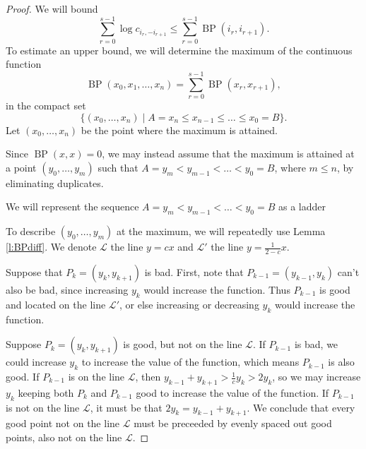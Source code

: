\documentclass[10pt,a4paper]{amsart}
\newcommand{\BP}{\operatorname{BP}}
\begin{document}
\begin{proof}
We will bound
\[\sum_{r=0}^{s-1} \log c_{i_r,-i_{r+1}}\leq
\sum_{r=0}^{s-1}\BP(i_r,i_{r+1}).\]
To estimate an upper bound, we will determine the maximum of the continuous function
\[\BP(x_0,x_1,\ldots,x_n)=\sum_{r=0}^{s-1}\BP(x_r,x_{r+1}),\]
in the compact set
\[\{(x_0,\ldots, x_n)\mid A=x_n\leq x_{n-1}\leq\ldots \leq x_0=B\}.\]
Let $(x_0,\ldots, x_n)$ be the point
where the maximum is attained.

Since $\BP(x,x)=0$, we may instead assume that the maximum is
attained at a point $(y_0,\ldots, y_m)$ such that
$A=y_m<y_{m-1}<\ldots<y_0=B$, where $m\leq n$, by eliminating
duplicates.

We will represent the sequence $A=y_m<y_{m-1}<\ldots <y_0=B$ as
a ladder



\begin{center}

\end{center}

To describe $(y_0,\ldots, y_m)$ at the maximum, we will
repeatedly use Lemma \ref{l:BPdiff}. We denote $\mathcal{L}$ the line $y=cx$ and $\mathcal{L}'$ the line $y=\frac{1}{2-c}x$.

Suppose that $P_k=(y_k,y_{k+1})$ is bad. First, note that $P_{k-1}=(y_{k-1},y_k)$
can't also be bad, since increasing
$y_k$ would increase the function. Thus 
$P_{k-1}$ is good and located on the line $\mathcal{L}'$, or else increasing or decreasing
$y_k$ would increase the function.

Suppose $P_k=(y_k,y_{k+1})$ is good, but not on the line
$\mathcal{L}$. If $P_{k-1}$ is bad, we could increase $y_k$ to increase
the value of the function, which means $P_{k-1}$ is also
good. If $P_{k-1}$ is on the line $\mathcal{L}$, then
$y_{k-1}+y_{k+1}>\frac{1}{c}y_k>2y_k$, so we may increase $y_k$
keeping both $P_k$ and $P_{k-1}$ good to increase the value of
the function. If $P_{k-1}$ is not on the line $\mathcal{L}$, it must be
that $2y_k=y_{k-1}+y_{k+1}$. We conclude that every good point not on the line $\mathcal{L}$ must be preceeded by evenly spaced out good points, also not on the line $\mathcal{L}$.


\end{proof}
\end{document}
